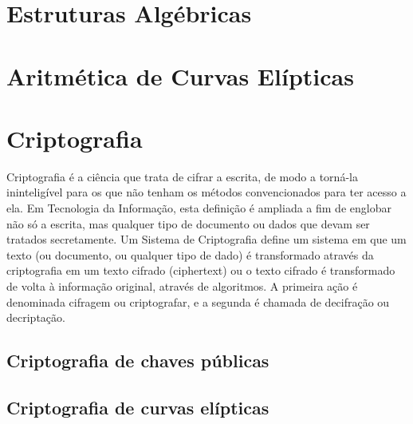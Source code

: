 
%
%
\section{Estruturas Algébricas}

%
%
\section{Aritmética de Curvas Elípticas}

%
%
\section{Criptografia} \label{sec:criptografia}
Criptografia é a ciência que trata de cifrar a escrita, de modo a torná-la ininteligível para os que não tenham os métodos convencionados para ter acesso a ela. Em Tecnologia da Informação, esta definição é ampliada a fim de englobar não só a escrita, mas qualquer tipo de documento ou dados que devam ser tratados secretamente. Um Sistema de Criptografia define um sistema em que um texto (ou documento, ou qualquer tipo de dado) é transformado através da criptografia em um texto cifrado (ciphertext) ou o texto cifrado é transformado de volta à informação original, através de algoritmos. A primeira ação é denominada cifragem ou criptografar, e a segunda é chamada de decifração ou decriptação. \cite{Portnoi:2005}

%
%
\subsection{Criptografia de chaves públicas}

%
%
\subsection{Criptografia de curvas elípticas}
